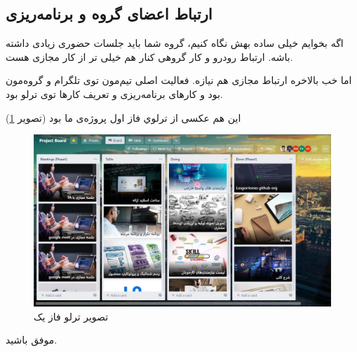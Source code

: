 \subsection{ارتباط اعضای گروه و برنامه‌ریزی}
اگه بخوایم خیلی ساده بهش نگاه کنیم، گروه شما باید جلسات حضوری زیادی داشته باشه. ارتباط رودرو و کار گروهی کنار هم خیلی ‌تر از کار مجازی‌ هست.

اما خب بالاخره ارتباط مجازی هم نیازه. فعالیت اصلی تیم‌مون توی تلگرام و گروه‌مون بود و کار‌های برنامه‌ریزی و تعریف کارها توی ترلو بود.

این هم عکسی از ترلوي فاز اول پروژه‌ی ما بود (تصویر \ref{trello})
\begin{figure}[H]
	\begin{center}
		\includegraphics[width=\textwidth, angle=90, height=\textheight]{./images/trello}
	\end{center}
\caption{تصویر ترلو فاز یک}
\label{trello}
\end{figure}

\begin{flushleft}
	موفق باشید.
\end{flushleft}